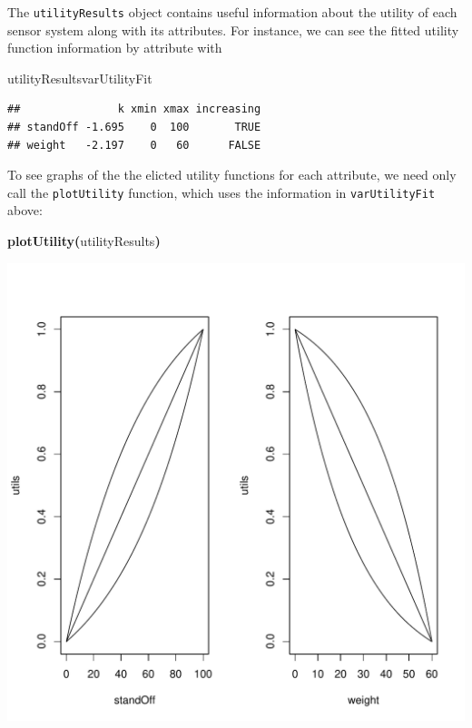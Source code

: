 \documentclass{article}
\makeatletter
\newcommand{\hlfunctioncall}[1]{\textcolor[rgb]{.5,0,.33}{\textbf{#1}}}%
\newcommand{\hlkeyword}[1]{\textbf{#1}}%
\newcommand{\hlsymbol}[1]{#1}%
\newenvironment{kframe}{%
 \def\FrameCommand##1{\hskip\@totalleftmargin \hskip-\fboxsep
 \colorbox{shadecolor}{##1}\hskip-\fboxsep
     \hskip-\linewidth \hskip-\@totalleftmargin \hskip\columnwidth}%
 \MakeFramed {\advance\hsize-\width
   \@totalleftmargin\z@ \linewidth\hsize
   \@setminipage}}%
 {\par\unskip\endMakeFramed}
\newenvironment{knitrout}{}{} %
\makeatother
\begin{document}
The {\tt utilityResults} object contains useful information about the utility of each sensor
system along with its attributes. For instance, we can see the fitted utility function
information by attribute with

\begin{knitrout}
\color{fgcolor}\begin{kframe}
\begin{flushleft}
\ttfamily\noindent
\hlsymbol{utilityResults}\hlkeyword{\usebox{\hlnormalsizeboxdollar}}\hlsymbol{varUtilityFit}\mbox{}
\normalfont
\end{flushleft}
\begin{verbatim}
##               k xmin xmax increasing
## standOff -1.695    0  100       TRUE
## weight   -2.197    0   60      FALSE
\end{verbatim}
\end{kframe}
\end{knitrout}


To see graphs of the the elicted utility functions for each attribute, we need only call the {\tt plotUtility} function, which uses the information in {\tt varUtilityFit} above:

\begin{knitrout}
\color{fgcolor}\begin{kframe}
\begin{flushleft}
\ttfamily\noindent
\hlfunctioncall{plotUtility}\hlkeyword{(}\hlsymbol{utilityResults}\hlkeyword{)}\mbox{}
\normalfont
\end{flushleft}
\end{kframe}\includegraphics{plotUtility} 
\end{knitrout}
\end{document}
